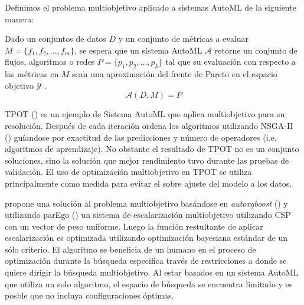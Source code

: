 Definimos el problema multiobjetivo aplicado a sistemas AutoML de la siguiente manera:
\begin{definition}\label{background:def:moo-automl-problem}
    Dado un conjuntos de datos $D$ y  un conjunto de m\'etricas a evaluar $M = \{f_1, f_2, ...,f_m\}$, se espera que  un sistema AutoML $\mathcal{A}$ retorne un conjunto de flujos, algoritmos o redes $P = \{p_1, p_2, ..., p_k\}$ tal que su evaluaci\'on con respecto a las m\'etricas en $M$ sean una aproximaci\'on del frente de Pareto en el espacio objetivo $\mathcal{Y}$ .
    \begin{equation*}
        \mathcal{A}(D, M) = P  
    \end{equation*}
\end{definition}

TPOT (\cite{pmlr-v64-olson_tpot_2016}) es un ejemplo de Sistema AutoML que aplica multiobjetivo para su resoluci\'on. Despu\'es de cada iteraci\'on ordena los algoritmos utilizando NSGA-II (\cite{deb2002fast}) gu\'iandose por exactitud de las predicciones y n\'umero de operadores (i.e. algoritmos de aprendizaje). No obstante el resultado de TPOT no es un conjunto soluciones, sino la soluci\'on que mejor rendimiento tuvo durante las pruebas de validaci\'on. El uso de optimizaci\'on multiobjetivo en TPOT se utiliza principalmente como medida para evitar el sobre ajuste del modelo a los datos.

\cite{pfisterer2019multi} propone una soluci\'on al problema multiobjetivo bas\'andose en \textit{autoxgboost} (\cite{thomas2018automatic}) y utilizando  parEgo (\cite{knowles2006parego}) un sistema de escalarizaci\'on multiobjetivo utilizando CSP con un vector de peso uniforme. Luego la funci\'on restultante de aplicar escalarizaci\'on es optimizada utilizando optimizaci\'on bayesiana est\'andar de un s\'olo criterio.
El algoritmo se beneficia de un humano en el proceso de optimizaci\'on durante la b\'usqueda especifica trav\'es de restricciones a donde se quiere dirigir la b\'usqueda multiobjetivo.
Al estar basados en un sistema AutoML que utiliza un solo algoritmo, el espacio de b\'usqueda se encuentra limitado y es posble que no incluya configuraciones \'optimas.




